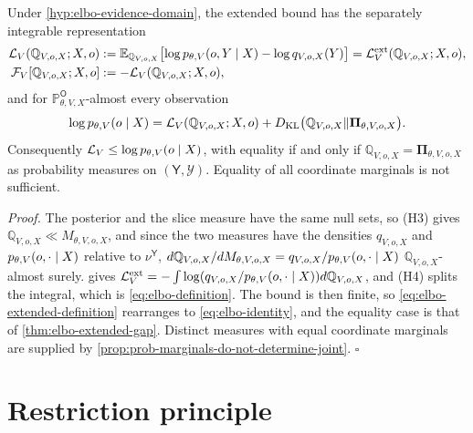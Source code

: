 \label{cor:elbo-bound-tightness}
Under \cref{hyp:elbo-evidence-domain}, the extended bound has the separately
integrable representation
\begin{align}
\mathcal L_V(\mathbb Q_{V,o,X};X,o)
&:=\mathbb E_{\mathbb Q_{V,o,X}}\bigl[\log p_{\theta,V}(o,Y\mid X)-\log q_{V,o,X}(Y)\bigr]
=\mathcal L_V^{\mathrm{ext}}(\mathbb Q_{V,o,X};X,o),
\label{eq:elbo-definition}\\
\mathcal F_V[\mathbb Q_{V,o,X};X,o]&:=-\mathcal L_V(\mathbb Q_{V,o,X};X,o),
\label{eq:elbo-free-energy}
\end{align}
and for $\mathbb P^{\mathsf O}_{\theta,V,X}$-almost every observation
\begin{equation}
\log p_{\theta,V}(o\mid X)=\mathcal L_V(\mathbb Q_{V,o,X};X,o)
+D_{\mathrm{KL}}\bigl(\mathbb Q_{V,o,X}\Vert\boldsymbol\Pi_{\theta,V,o,X}\bigr).
\label{eq:elbo-identity}
\end{equation}
Consequently $\mathcal L_V\leq\log p_{\theta,V}(o\mid X)$, with equality if and
only if $\mathbb Q_{V,o,X}=\boldsymbol\Pi_{\theta,V,o,X}$ as probability
measures on $(\mathsf Y,\mathscr Y)$. Equality of all coordinate marginals is
not sufficient. 

\noindent\emph{Proof.}
The posterior and the slice measure have the same null sets, so (H3) gives
$\mathbb Q_{V,o,X}\ll M_{\theta,V,o,X}$, and since the two measures have the
densities $q_{V,o,X}$ and $p_{\theta,V}(o,\cdot\mid X)$ relative to
$\nu^{\mathsf Y}$, $d\mathbb Q_{V,o,X}/dM_{\theta,V,o,X}=q_{V,o,X}/p_{\theta,V}(o,\cdot\mid X)$
$\mathbb Q_{V,o,X}$-almost surely.
 gives
$\mathcal L_V^{\mathrm{ext}}=-\int\log(q_{V,o,X}/p_{\theta,V}(o,\cdot\mid X))d\mathbb Q_{V,o,X}$,
and (H4) splits the integral, which is \eqref{eq:elbo-definition}. The bound is
then finite, so \eqref{eq:elbo-extended-definition} rearranges to
\eqref{eq:elbo-identity}, and the equality case is that of
\cref{thm:elbo-extended-gap}. Distinct measures with equal coordinate marginals
are supplied by \cref{prop:prob-marginals-do-not-determine-joint}.
\hfill$\square$

\section{Restriction principle}
\label{sec:restrict-principle}

